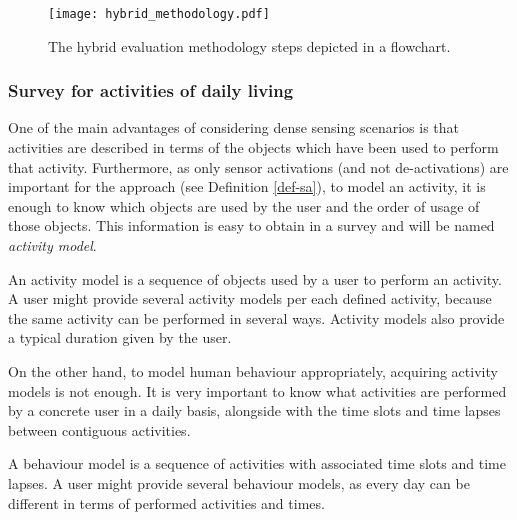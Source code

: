 \begin{figure}[htbp]
\centering
\texttt{[image: hybrid\_methodology.pdf]}
    \caption{The hybrid evaluation methodology steps depicted in a flowchart.}
    \label{fig-methodology}
\end{figure}

\subsubsection{Survey for activities of daily living}
\label{subsubsec:evaluation:survey}
\begin{comment}
 - Explain each of the questions of the survey
 - Show a screenshot and provide the link to the Google Form
 - Google Forms guarantee users' anonymity
 - Explain survey-script translation criteria
\end{comment}

One of the main advantages of considering dense sensing scenarios is that activities are described in terms of the objects which have been used to perform that activity. Furthermore, as only sensor activations (and not de-activations) are important for the approach (see Definition \ref{def-sa}), to model an activity, it is enough to know which objects are used by the user and the order of usage of those objects. This information is easy to obtain in a survey and will be named \textit{activity model}.

\begin{defn}
\label{def-act-model}
 An activity model is a sequence of objects used by a user to perform an activity. A user might provide several activity models per each defined activity, because the same activity can be performed in several ways. Activity models also provide a typical duration given by the user.
\end{defn}

On the other hand, to model human behaviour appropriately, acquiring activity models is not enough. It is very important to know what activities are performed by a concrete user in a daily basis, alongside with the time slots and time lapses between contiguous activities. 

\begin{defn}
\label{def-behaviour}
 A behaviour model is a sequence of activities with associated time slots and time lapses. A user might provide several behaviour models, as every day can be different in terms of performed activities and times.
\end{defn}

